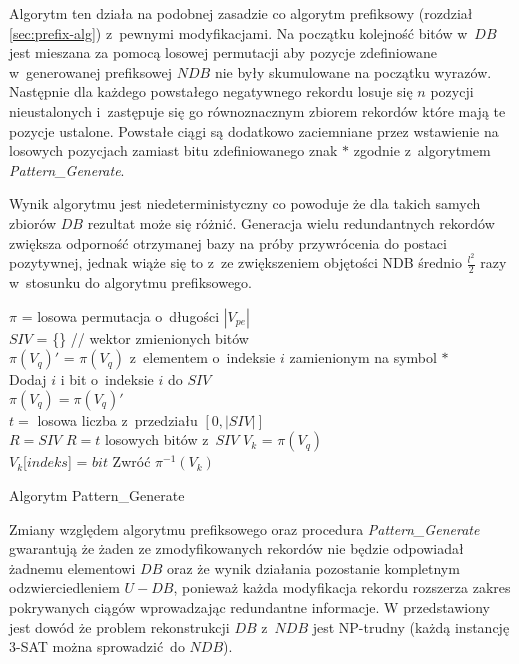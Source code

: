 Algorytm ten działa na podobnej zasadzie co algorytm prefiksowy (rozdział \ref{sec:prefix-alg}) z~pewnymi modyfikacjami.
Na początku kolejność bitów w~$DB$ jest mieszana za pomocą losowej permutacji aby pozycje zdefiniowane w~generowanej prefiksowej $NDB$ nie były skumulowane na początku wyrazów. Następnie dla każdego powstałego negatywnego rekordu losuje się $n$ pozycji nieustalonych i~zastępuje się go równoznacznym zbiorem rekordów które mają te pozycje ustalone. 
Powstałe ciągi są dodatkowo zaciemniane przez wstawienie na losowych pozycjach zamiast bitu zdefiniowanego znak $*$ zgodnie z~algorytmem \textit{Pattern\_Generate}.

Wynik algorytmu jest niedeterministyczny co powoduje że dla takich samych zbiorów $DB$ rezultat może się różnić. Generacja wielu redundantnych rekordów zwiększa odporność otrzymanej bazy na próby przywrócenia do postaci pozytywnej, jednak wiąże się to z~ze zwiększeniem objętości NDB średnio $\frac{l^2}{2}$ razy w~stosunku do algorytmu prefiksowego.


\begin{algorithm}[!htb]
    \SetAlgoLined
    $\pi$ = losowa permutacja o~długości $|V_{pe}|$\\
    $SIV$ = \{\} // wektor zmienionych bitów\\
    {
        $\pi(V_{q})'$ = $\pi(V_{q})$ z~elementem o~indeksie $i$ zamienionym na symbol $*$\\
        {
            Dodaj $i$ i bit o~indeksie $i$ do $SIV$\\
            $\pi(V_{q}) = \pi(V_{q})'$\\
        }  
    }
    $t =$ losowa liczba z~przedziału $[0, |SIV|]$\\
    {
        $R = SIV$
    }
    \Else
    {
        $R = t$ losowych bitów z~$SIV$ 
    }
    $V_k$ = $\pi(V_{q})$\\
    {
        $V_k$[$indeks$] = $bit$
    }
    Zwróć $\pi^{-1}(V_k)$ 
    
    \caption{Algorytm Pattern\_Generate}
    \label{alg:pattern-generate}
\end{algorithm}

Zmiany względem algorytmu prefiksowego oraz procedura \textit{Pattern\_Generate} gwarantują że żaden ze zmodyfikowanych rekordów nie będzie odpowiadał żadnemu elementowi $DB$ oraz że wynik działania pozostanie kompletnym odzwierciedleniem $U - DB$,
ponieważ każda modyfikacja rekordu rozszerza zakres pokrywanych ciągów wprowadzając redundantne informacje.
W \cite{NRI-Esponda} przedstawiony jest dowód że problem rekonstrukcji $DB$ z~$NDB$ jest NP-trudny (każdą instancję 3-SAT można sprowadzić do $NDB$).

